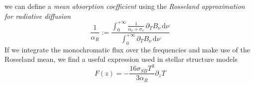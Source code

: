 we can define a \emph{mean absorption coefficient} using the \emph{Rosseland approximation for radiative diffusion}
\begin{equation}
	\frac{1}{\alpha_{R}} := \frac{\int_{0}^{+\infty}\frac{1}{\alpha_{\nu}+\sigma_{\nu}}\,\partial_{T}B_{\nu}\,\text{d}\nu}{\int_{0}^{+\infty}\partial_{T}B_{\nu}\,\text{d}\nu}
	\label{eq:rosselandopacity}
\end{equation}
If we integrate the monochromatic flux over the frequencies and make use of the Rosseland mean, we find a useful expression used in stellar structure models
\begin{equation}
	F(z) = -\frac{16\sigma_{SB}T^{3}}{3\alpha_{R}}\partial_{z}T
	\label{eq:sstr4}
\end{equation}